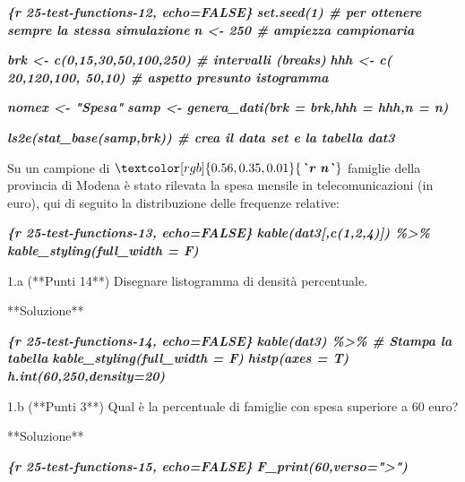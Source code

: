 \documentclass[
  11pt,
]{book}
\newenvironment{Shaded}{\begin{snugshade}}{\end{snugshade}}
\newcommand{\InformationTok}[1]{\textcolor[rgb]{0.56,0.35,0.01}{\textbf{\textit{#1}}}}
\newcommand{\NormalTok}[1]{#1}
\theoremstyle{mytheoremstyle}
\theoremstyle{mydefstyle}
\begin{document}
\begin{Shaded}
\begin{Highlighting}[]
\InformationTok{\textasciigrave{}\textasciigrave{}\textasciigrave{}\{r 25{-}test{-}functions{-}12, echo=FALSE\} }
\InformationTok{set.seed(1)                      \# per ottenere sempre la stessa simulazione}
\InformationTok{n \textless{}{-} 250                         \# ampiezza campionaria}

\InformationTok{brk  \textless{}{-} c(0,15,30,50,100,250)          \# intervalli (breaks)}
\InformationTok{hhh  \textless{}{-} c( 20,120,100, 50,10)       \# aspetto presunto istogramma}

\InformationTok{nomex \textless{}{-} "Spesa"}
\InformationTok{samp \textless{}{-} genera\_dati(brk = brk,hhh = hhh,n = n)}

\InformationTok{ls2e(stat\_base(samp,brk))        \# crea il data set e la tabella dat3}
\InformationTok{\textasciigrave{}\textasciigrave{}\textasciigrave{}}

\NormalTok{Su un campione di $}\InformationTok{\textasciigrave{}r n\textasciigrave{}}\NormalTok{$ famiglie della provincia di Modena è stato }
\NormalTok{rilevata la spesa mensile in telecomunicazioni (in euro), qui di seguito la }
\NormalTok{distribuzione delle frequenze relative:}

\InformationTok{\textasciigrave{}\textasciigrave{}\textasciigrave{}\{r 25{-}test{-}functions{-}13, echo=FALSE\} }
\InformationTok{kable(dat3[,c(1,2,4)]) \%\textgreater{}\%}
\InformationTok{  kable\_styling(full\_width = F)}
\InformationTok{\textasciigrave{}\textasciigrave{}\textasciigrave{}}

\NormalTok{1.a (**Punti 14**) Disegnare l\textquotesingle{}istogramma di densità }
\NormalTok{percentuale.}

\NormalTok{**Soluzione**}

\InformationTok{\textasciigrave{}\textasciigrave{}\textasciigrave{}\{r 25{-}test{-}functions{-}14, echo=FALSE\} }
\InformationTok{kable(dat3) \%\textgreater{}\%            \# Stampa la tabella}
\InformationTok{  kable\_styling(full\_width = F)}
\InformationTok{histp(axes = T)}
\InformationTok{h.int(60,250,density=20)}
\InformationTok{\textasciigrave{}\textasciigrave{}\textasciigrave{}}

\NormalTok{1.b (**Punti 3**) Qual è la percentuale di famiglie con }
\NormalTok{spesa superiore a 60 euro?}

\NormalTok{**Soluzione**}

\InformationTok{\textasciigrave{}\textasciigrave{}\textasciigrave{}\{r 25{-}test{-}functions{-}15, echo=FALSE\} }
\InformationTok{F\_print(60,verso="\textgreater{}")}
\InformationTok{\textasciigrave{}\textasciigrave{}\textasciigrave{}}
\end{Highlighting}
\end{Shaded}
\end{document}
